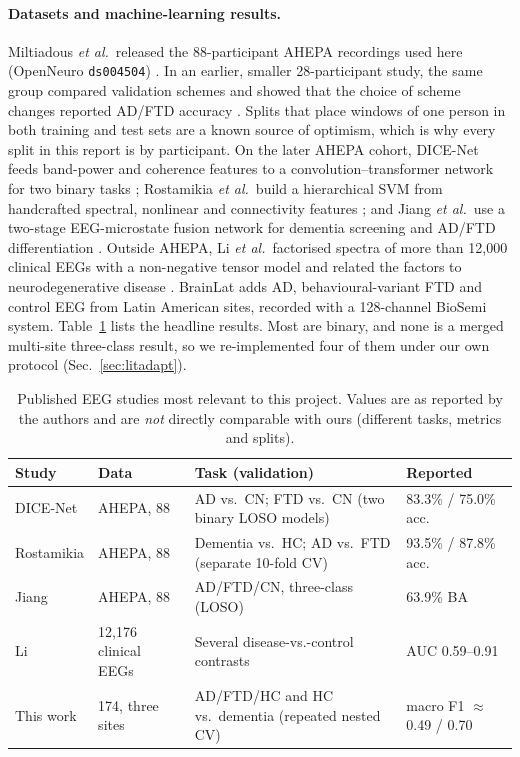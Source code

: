 \documentclass[10pt,twocolumn,a4paper]{article}
\newcommand{\code}[1]{\texttt{\small #1}}
\begin{document}
\paragraph{Datasets and machine-learning results.} Miltiadous \emph{et al.}\ released the 88-participant AHEPA recordings used here (OpenNeuro \code{ds004504}) \cite{miltiadous2023}. In an earlier, smaller 28-participant study, the same group compared validation schemes and showed that the choice of scheme changes reported AD/FTD accuracy \cite{miltiadous2021}. Splits that place windows of one person in both training and test sets are a known source of optimism, which is why every split in this report is by participant. On the later AHEPA cohort, DICE-Net feeds band-power and coherence features to a convolution--transformer network for two binary tasks \cite{dice2023}; Rostamikia \emph{et al.}\ build a hierarchical SVM from handcrafted spectral, nonlinear and connectivity features \cite{rostamikia2024}; and Jiang \emph{et al.}\ use a two-stage EEG-microstate fusion network for dementia screening and AD/FTD differentiation \cite{jiang2026}. Outside AHEPA, Li \emph{et al.}\ factorised spectra of more than 12,000 clinical EEGs with a non-negative tensor model and related the factors to neurodegenerative disease \cite{li2024}. BrainLat \cite{prado2023} adds AD, behavioural-variant FTD and control EEG from Latin American sites, recorded with a 128-channel BioSemi system. Table~\ref{tab:lit} lists the headline results. Most are binary, and none is a merged multi-site three-class result, so we re-implemented four of them under our own protocol (Sec.~\ref{sec:litadapt}).

\begin{table}[t]
\centering\scriptsize
\caption{Published EEG studies most relevant to this project. Values are as reported by the authors and are \emph{not} directly comparable with ours (different tasks, metrics and splits).}
\label{tab:lit}
\begin{tabular}{@{}p{}p{}p{}p{}@{}}
\toprule
Study & Data & Task (validation) & Reported\\
\midrule
DICE-Net \cite{dice2023} & AHEPA, 88 & AD vs.\ CN; FTD vs.\ CN (two binary LOSO models) & 83.3\% / 75.0\% acc.\\
Rostamikia \cite{rostamikia2024} & AHEPA, 88 & Dementia vs.\ HC; AD vs.\ FTD (separate 10-fold CV) & 93.5\% / 87.8\% acc.\\
Jiang \cite{jiang2026} & AHEPA, 88 & AD/FTD/CN, three-class (LOSO) & 63.9\% BA\\
Li \cite{li2024} & 12,176 clinical EEGs & Several disease-vs.-control contrasts & AUC 0.59--0.91\\
\midrule
This work & 174, three sites & AD/FTD/HC and HC vs.\ dementia (repeated nested CV) & macro F1 $\approx$0.49 / 0.70\\
\bottomrule
\end{tabular}
\end{table}
\end{document}
